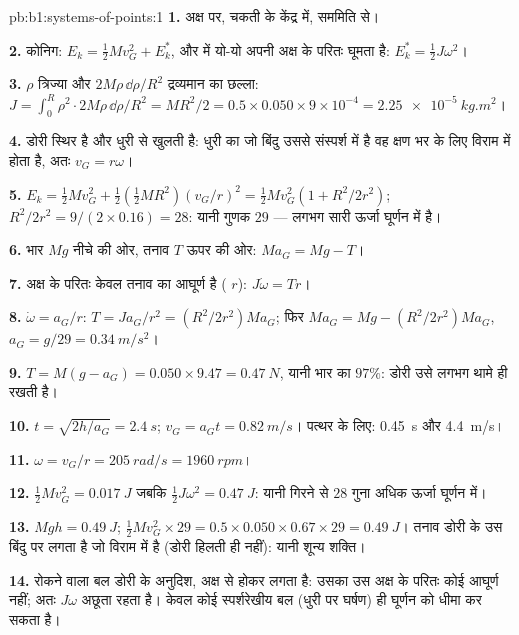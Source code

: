 \begin{solution}{pb:b1:systems-of-points:1}
\textbf{1.} अक्ष पर, चकती के केंद्र में, सममिति से।

\textbf{2.} कोनिग: $E_k = \tfrac12 Mv_G^2 + E_k^*$, और  में
यो-यो अपनी अक्ष के परितः घूमता है: $E_k^* = \tfrac12 J\omega^2$।

\textbf{3.} $\rho$ त्रिज्या और $2M\rho\,\dd\rho/R^2$ द्रव्यमान का छल्ला: $J = \int_0^R
\rho^2\cdot 2M\rho\,\dd\rho/R^2 = MR^2/2 = 0.5 \times 0.050 \times 9\times10^{-4}
= \qty{2.25e-5}{kg.m^2}$।

\textbf{4.} डोरी स्थिर है और धुरी से खुलती है: धुरी का जो बिंदु उससे
संस्पर्श में है वह क्षण भर के लिए विराम में होता है, अतः $v_G = r\omega$।

\textbf{5.} $E_k = \tfrac12 Mv_G^2 + \tfrac12(\tfrac12 MR^2)(v_G/r)^2 = \tfrac12
Mv_G^2(1 + R^2/2r^2)$; $R^2/2r^2 = 9/(2 \times 0.16) = 28$: यानी गुणक $29$ ---
लगभग सारी ऊर्जा घूर्णन में है।

\textbf{6.} भार $Mg$ नीचे की ओर, तनाव $T$ ऊपर की ओर: $Ma_G = Mg - T$।

\textbf{7.} अक्ष के परितः केवल तनाव का आघूर्ण है ( $r$):
$J\dot\omega = Tr$।

\textbf{8.} $\dot\omega = a_G/r$: $T = Ja_G/r^2 = (R^2/2r^2)Ma_G$; फिर
$Ma_G = Mg - (R^2/2r^2)Ma_G$, $a_G = g/29 = \qty{0.34}{m/s^2}$।

\textbf{9.} $T = M(g - a_G) = 0.050 \times 9.47 = \qty{0.47}{N}$, यानी भार का
$97\%$: डोरी उसे लगभग थामे ही रखती है।

\textbf{10.} $t = \sqrt{2h/a_G} = \qty{2.4}{s}$; $v_G = a_Gt = \qty{0.82}{m/s}$।
पत्थर के लिए: \qty{0.45}{s} और \qty{4.4}{m/s}।

\textbf{11.} $\omega = v_G/r = \qty{205}{rad/s} = \qty{1960}{rpm}$।

\textbf{12.} $\tfrac12 Mv_G^2 = \qty{0.017}{J}$ जबकि $\tfrac12 J\omega^2 =
\qty{0.47}{J}$: यानी गिरने से $28$ गुना अधिक ऊर्जा घूर्णन में।

\textbf{13.} $Mgh = \qty{0.49}{J}$; $\tfrac12 Mv_G^2 \times 29 = 0.5 \times 0.050
\times 0.67 \times 29 = \qty{0.49}{J}$। तनाव डोरी के उस बिंदु पर लगता है जो
विराम में है (डोरी हिलती ही नहीं): यानी शून्य शक्ति।

\textbf{14.} रोकने वाला बल डोरी के अनुदिश, अक्ष से होकर लगता है: उसका उस
अक्ष के परितः कोई आघूर्ण नहीं; अतः  $J\omega$ अछूता रहता है। केवल
कोई स्पर्शरेखीय बल (धुरी पर घर्षण) ही घूर्णन को धीमा कर सकता है।


\end{solution}

